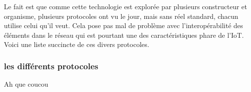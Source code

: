 Le fait est que comme cette technologie est explorée par plusieurs constructeur et organisme, plusieurs protocoles ont vu le jour, mais sans réel standard, chacun utilise celui qu'il veut. Cela pose pas mal de problème avec l'interopérabilité des éléments dans le réseau qui est pourtant une des caractéristiques phare de l'IoT. Voici une liste succincte de ces divers protocoles.

\subsubsection{les différents protocoles}

Ah que coucou
